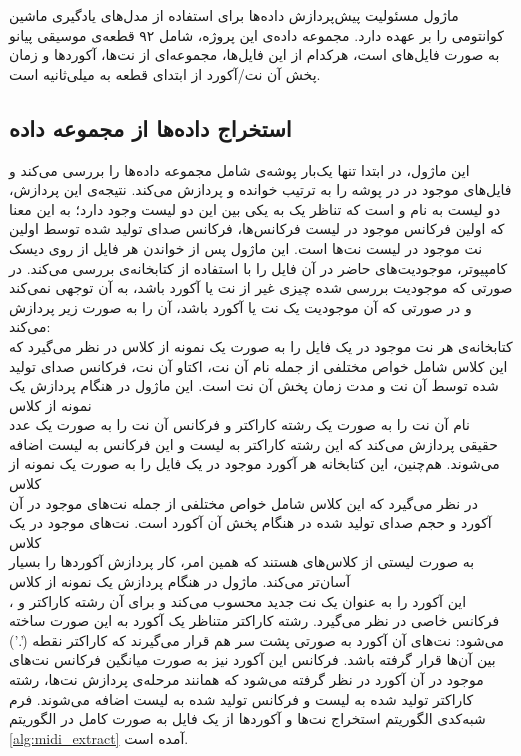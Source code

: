 ماژول
مسئولیت پیش‌پردازش داده‌ها برای استفاده از مدل‌های یادگیری ماشین کوانتومی را بر عهده دارد.
مجموعه داده‌ی این پروژه، شامل ۹۲ قطعه‌ی موسیقی پیانو به صورت فایل‌های 
است، هرکدام از این فایل‌ها، مجموعه‌ای از نت‌ها، آکوردها و زمان پخش آن نت/آکورد از ابتدای قطعه به میلی‌ثانیه است.

\subsection{استخراج داده‌ها از مجموعه داده}
این ماژول، در ابتدا تنها یک‌بار پوشه‌ی شامل مجموعه داده‌ها را بررسی می‌کند و فایل‌های
موجود در در پوشه را به ترتیب خوانده و پردازش می‌کند. نتیجه‌ی این پردازش، دو لیست به نام
و
است که تناظر یک به یکی بین این دو لیست وجود دارد؛ به این معنا که اولین فرکانس موجود در لیست فرکانس‌ها، فرکانس صدای تولید شده توسط اولین نت موجود در لیست نت‌ها است.
این ماژول پس از خواندن هر فایل
از روی دیسک کامپیوتر، موجودیت‌های حاضر در آن فایل را با استفاده از کتابخانه‌ی
بررسی می‌کند. در صورتی که موجودیت بررسی شده چیزی غیر از نت یا آکورد باشد، به آن توجهی نمی‌کند و در صورتی که آن موجودیت یک نت یا آکورد باشد، آن را به صورت زیر پردازش می‌کند: \\
کتابخانه‌ی
هر نت موجود در یک فایل
را به صورت یک نمونه از کلاس
در نظر می‌گیرد که این کلاس شامل خواص مختلفی از جمله نام آن نت، اکتاو آن نت، فرکانس صدای تولید شده توسط آن نت و مدت زمان پخش آن نت است.
این ماژول در هنگام پردازش یک نمونه از کلاس \\
نام آن نت را به صورت یک رشته کاراکتر و فرکانس آن نت را به صورت یک عدد حقیقی پردازش می‌کند که این رشته کاراکتر به لیست
و این فرکانس به لیست
اضافه می‌شوند.
هم‌چنین، این کتابخانه هر آکورد موجود در یک فایل
را به صورت یک نمونه از کلاس \\
در نظر می‌گیرد که این کلاس شامل خواص مختلفی از جمله نت‌های موجود در آن آکورد و حجم صدای تولید شده در هنگام پخش آن آکورد است.
نت‌های موجود در یک کلاس \\
به صورت لیستی از کلاس‌های
هستند که همین امر، کار پردازش آکوردها را بسیار آسان‌تر می‌کند.
ماژول
در هنگام پردازش یک نمونه از کلاس \\
،
این آکورد را به عنوان یک نت جدید محسوب می‌کند و برای آن رشته کاراکتر و فرکانس خاصی در نظر می‌گیرد.
رشته کاراکتر متناظر یک آکورد به این صورت ساخته می‌شود: نت‌های آن آکورد به صورتی پشت سر هم قرار می‌گیرند که کاراکتر نقطه
('.')
بین آن‌ها قرار گرفته باشد. فرکانس این آکورد نیز به صورت میانگین فرکانس نت‌های موجود در آن آکورد در نظر گرفته می‌شود که همانند مرحله‌ی پردازش نت‌ها، رشته کاراکتر تولید شده به لیست
و فرکانس تولید شده به لیست
اضافه می‌شوند.
فرم شبه‌کدی الگوریتم استخراج نت‌ها و آکوردها از یک فایل به صورت کامل در الگوریتم
\ref{alg:midi_extract}
آمده است.

